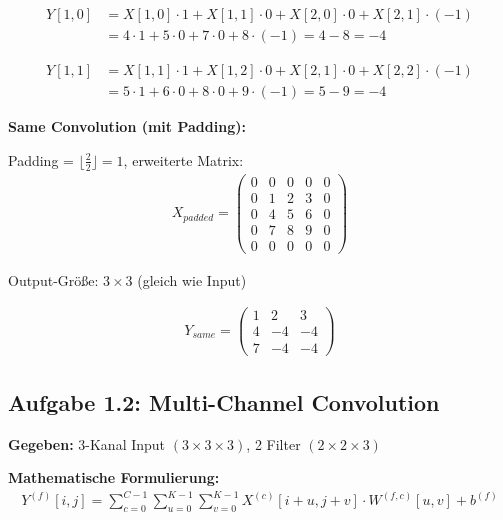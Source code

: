 ﻿\documentclass[12pt,a4paper]{article}
\begin{document}
\begin{align}
Y[1,0] &= X[1,0] \cdot 1 + X[1,1] \cdot 0 + X[2,0] \cdot 0 + X[2,1] \cdot (-1) \\
&= 4 \cdot 1 + 5 \cdot 0 + 7 \cdot 0 + 8 \cdot (-1) = 4 - 8 = -4
\end{align}

\begin{align}
Y[1,1] &= X[1,1] \cdot 1 + X[1,2] \cdot 0 + X[2,1] \cdot 0 + X[2,2] \cdot (-1) \\
&= 5 \cdot 1 + 6 \cdot 0 + 8 \cdot 0 + 9 \cdot (-1) = 5 - 9 = -4
\end{align}


\textbf{Same Convolution (mit Padding):}

Padding = $\lfloor \frac{2}{2} \rfloor = 1$, erweiterte Matrix:
\begin{align}
X_{padded} = \begin{pmatrix} 
0 & 0 & 0 & 0 & 0 \\
0 & 1 & 2 & 3 & 0 \\
0 & 4 & 5 & 6 & 0 \\
0 & 7 & 8 & 9 & 0 \\
0 & 0 & 0 & 0 & 0
\end{pmatrix}
\end{align}

Output-Größe: $3 \times 3$ (gleich wie Input)

\begin{align}
Y_{same} = \begin{pmatrix} 
1 & 2 & 3 \\
4 & -4 & -4 \\
7 & -4 & -4
\end{pmatrix}
\end{align}

\subsection{Aufgabe 1.2: Multi-Channel Convolution}

\textbf{Gegeben:} 3-Kanal Input $(3 \times 3 \times 3)$, 2 Filter $(2 \times 2 \times 3)$

\textbf{Mathematische Formulierung:}
\begin{align}
Y^{(f)}[i,j] = \sum_{c=0}^{C-1} \sum_{u=0}^{K-1} \sum_{v=0}^{K-1} X^{(c)}[i+u, j+v] \cdot W^{(f,c)}[u,v] + b^{(f)}
\end{align}
\end{document}
